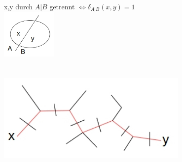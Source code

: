 x,y durch $A|B$ getrennt $\Leftrightarrow \delta_{A|B}(x,y)=1$\\
\includegraphics[width=0.2\textwidth]{lectures/161216/pix/1.jpg}\\

\\\\

\includegraphics[width=0.7\textwidth]{lectures/161216/pix/2.jpg}\\

